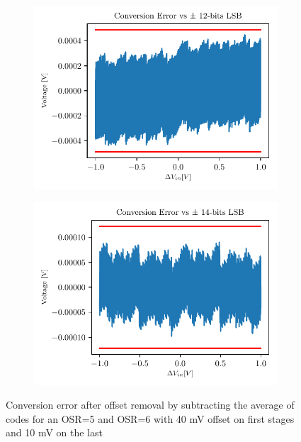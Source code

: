 \begin{figure}[htp]
	\centering
	\begin{subfigure}[b]{0.48\textwidth}
		\centering
		\includegraphics[width=\textwidth]{Chapter4/Figs/results/adc/adc_osr5_40mV-40mV-10mV-error.pdf}
		\label{fig:adc-osr5-error-offset}
	\end{subfigure}
	\begin{subfigure}[b]{0.48\textwidth}
		\centering
		\includegraphics[width=\textwidth]{Chapter4/Figs/results/adc/adc_osr6_40mV-40mV-10mV-error.pdf}
		\label{fig:adc-osr6-error-offset}
	\end{subfigure}
	\caption{Conversion error after offset removal by subtracting the average of codes for an OSR=5 and OSR=6 with 40 mV offset on first stages and 10 mV on the last}
	\label{fig:adc-osr-error-offset}
\end{figure}

